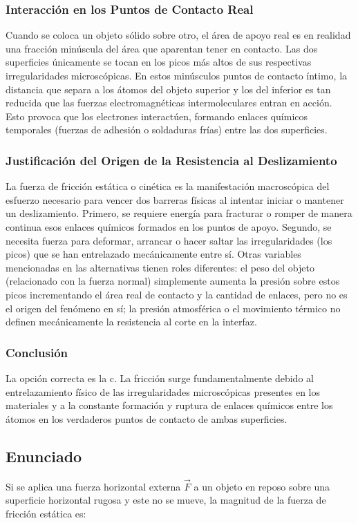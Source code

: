 \documentclass[12pt]{article}
\begin{document}
\subsubsection*{Interacción en los Puntos de Contacto Real}
Cuando se coloca un objeto sólido sobre otro, el área de apoyo real es en realidad una fracción minúscula del área que aparentan tener en contacto. Las dos superficies únicamente se tocan en los picos más altos de sus respectivas irregularidades microscópicas. En estos minúsculos puntos de contacto íntimo, la distancia que separa a los átomos del objeto superior y los del inferior es tan reducida que las fuerzas electromagnéticas intermoleculares entran en acción. Esto provoca que los electrones interactúen, formando enlaces químicos temporales (fuerzas de adhesión o soldaduras frías) entre las dos superficies.

\subsubsection*{Justificación del Origen de la Resistencia al Deslizamiento}
La fuerza de fricción estática o cinética es la manifestación macroscópica del esfuerzo necesario para vencer dos barreras físicas al intentar iniciar o mantener un deslizamiento. Primero, se requiere energía para fracturar o romper de manera continua esos enlaces químicos formados en los puntos de apoyo. Segundo, se necesita fuerza para deformar, arrancar o hacer saltar las irregularidades (los picos) que se han entrelazado mecánicamente entre sí. 
Otras variables mencionadas en las alternativas tienen roles diferentes: el peso del objeto (relacionado con la fuerza normal) simplemente aumenta la presión sobre estos picos incrementando el área real de contacto y la cantidad de enlaces, pero no es el origen del fenómeno en sí; la presión atmosférica o el movimiento térmico no definen mecánicamente la resistencia al corte en la interfaz.

\subsubsection*{Conclusión}
La opción correcta es la c. La fricción surge fundamentalmente debido al entrelazamiento físico de las irregularidades microscópicas presentes en los materiales y a la constante formación y ruptura de enlaces químicos entre los átomos en los verdaderos puntos de contacto de ambas superficies.

\newpage

\subsection*{Enunciado}
Si se aplica una fuerza horizontal externa $\vec{F}$ a un objeto en reposo sobre una superficie horizontal rugosa y este no se mueve, la magnitud de la fuerza de fricción estática es:
\end{document}
